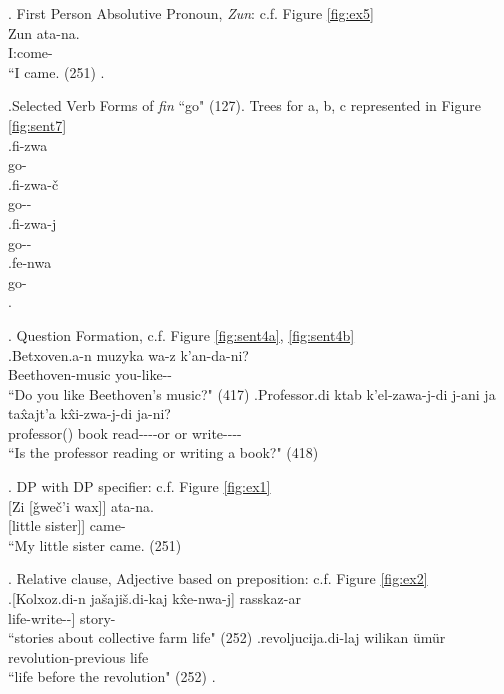\ex. First Person Absolutive Pronoun, \textit{Zun}: c.f. Figure \ref{fig:ex5} \\ 
    \gll\label{sent:ex5}Zun ata-na. \\
        I:\Abs[] come-\Aori[] \\
        ``I came. (251)
    \z.

\ex.\label{sent:ex7}Selected Verb Forms of \textit{fin} ``go" (127). Trees for a, b, c represented in Figure \ref{fig:sent7} \\
    \ag.fi-zwa \\
    go-\Impf[] \\
    \bg.fi-zwa-\v{c} \\
    go-\Impf[]-\Neg[] \\
    \cg.fi-zwa-j \\
    go-\Impf[]-\Pst[] \\
    \dg.fe-nwa \\
    go-\Prf[] \\
    \z.

\ex. \label{sent:ex4}Question Formation, c.f. Figure \ref{fig:sent4a}, \ref{fig:sent4b} \\
    \ag.\label{sent:ex4a}Betxoven.a-n muzyka wa-z k'an-da-ni? \\
    Beethoven-\Gen[] music you-\Dat[] like-\Fut[]-\Q[] \\
    ``Do you like Beethoven's music?" (417)
    \bg.\label{sent:ex4b}Professor.di ktab k'el-zawa-j-di j-ani ja ta\^{x}ajt'a k\^{x}i-zwa-j-di ja-ni? \\
    professor(\Erg[]) book read-\Impf[]-\Ptcp[]-\Sbstz[] \Cop[]-\Q[] or or write-\Impf[]-\Ptcp[]-\Sbstz[] \Cop[]-\Q[] \\
    ``Is the professor reading or writing a book?" (418)

\ex. DP with DP specifier: c.f. Figure \ref{fig:ex1} \\ 
    \gll\label{sent:ex1}[Zi [\v{g}we\v{c}'i wax]] ata-na. \\
        [I:\Gen[] [little sister]] came-\Aori[] \\
        ``My little sister came. (251)

\ex. Relative clause, Adjective based on preposition: c.f. Figure \ref{fig:ex2} \\
    \ag.\label{sent:ex2a}[Kolxoz.di-n ja\v{s}aji\v{s}.di-kaj k\^{x}e-nwa-j] rasskaz-ar \\
        [kolkhoz-\Gen[] life-\Sbelc[] write-\Prf[]-\Ptcp[]] story-\Pl[] \\
        ``stories about collective farm life" (252)
    \bg.\label{sent:ex2b}revoljucija.di-laj wilikan \"{u}m\"{u}r \\
        revolution-\Srelc[] previous life \\
        ``life before the revolution" (252)
    \z.
    
